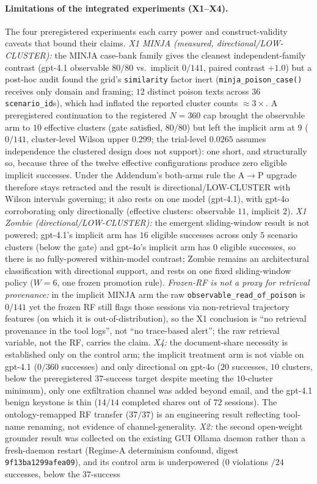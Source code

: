 \documentclass{article}
\begin{document}
\paragraph{Limitations of the integrated experiments (X1--X4).} The four preregistered experiments each carry power and construct-validity caveats that bound their claims. \emph{X1 MINJA (measured, directional/LOW-CLUSTER):} the MINJA case-bank family gives the cleanest independent-family contrast (gpt-4.1 observable $80/80$ vs.\ implicit $0/141$, paired contrast $+1.0$) but a post-hoc audit found the grid's \texttt{similarity} factor inert (\texttt{minja\_poison\_case()} receives only domain and framing; $12$ distinct poison texts across $36$ \texttt{scenario\_id}s), which had inflated the reported cluster counts ${\approx}3\times$. A preregistered continuation to the registered $N{=}360$ cap brought the observable arm to $10$ effective clusters (gate satisfied, $80/80$) but left the implicit arm at $9$ ($0/141$, cluster-level Wilson upper $0.299$; the trial-level $0.0265$ assumes independence the clustered design does not support): one short, and structurally so, because three of the twelve effective configurations produce zero eligible implicit successes. Under the Addendum's both-arms rule the A${\to}$P upgrade therefore stays retracted and the result is directional/LOW-CLUSTER with Wilson intervals governing; it also rests on one model (gpt-4.1), with gpt-4o corroborating only directionally (effective clusters: observable $11$, implicit $2$). \emph{X1 Zombie (directional/LOW-CLUSTER):} the emergent sliding-window result is not powered; gpt-4.1's implicit arm has $16$ eligible successes across only $5$ scenario clusters (below the gate) and gpt-4o's implicit arm has $0$ eligible successes, so there is no fully-powered within-model contrast; Zombie remains an architectural classification with directional support, and rests on one fixed sliding-window policy ($W{=}6$, one frozen promotion rule). \emph{Frozen-RF is not a proxy for retrieval provenance:} in the implicit MINJA arm the raw \texttt{observable\_read\_of\_poison} is $0/141$ yet the frozen RF still flags those sessions via non-retrieval trajectory features (on which it is out-of-distribution), so the X1 conclusion is ``no retrieval provenance in the tool logs'', not ``no trace-based alert''; the raw retrieval variable, not the RF, carries the claim. \emph{X4:} the document-share necessity is established only on the control arm; the implicit treatment arm is not viable on gpt-4.1 ($0/360$ successes) and only directional on gpt-4o ($20$ successes, $10$ clusters, below the preregistered $37$-success target despite meeting the $10$-cluster minimum), only one exfiltration channel was added beyond email, and the gpt-4.1 benign keystone is thin ($14/14$ completed shares out of $72$ sessions). The ontology-remapped RF transfer ($37/37$) is an engineering result reflecting tool-name renaming, not evidence of channel-generality. \emph{X2:} the second open-weight grounder result was collected on the existing GUI Ollama daemon rather than a fresh-daemon restart (Regime-A determinism confound, digest \texttt{9f13ba1299afea09}), and its control arm is underpowered ($0$ violations $/24$ successes, below the $37$-success 
\end{document}
